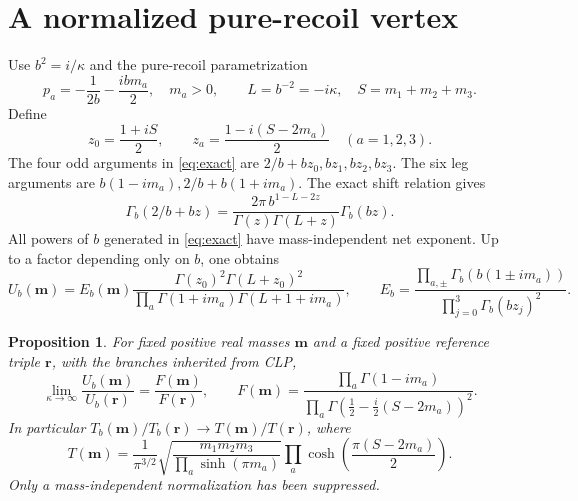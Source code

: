 \documentclass[11pt,a4paper]{article}
\newtheorem{proposition}{Proposition}
\begin{document}
\section{A normalized pure-recoil vertex}
Use \(b^2=i/\kappa\) and the pure-recoil parametrization
\[
 p_a=-\frac1{2b}-\frac{ibm_a}{2},\quad m_a>0,\qquad
 L=b^{-2}=-i\kappa,\quad S=m_1+m_2+m_3 .
\]
Define
\[
 z_0=\frac{1+iS}{2},\qquad
 z_a=\frac{1-i(S-2m_a)}2\quad(a=1,2,3).
\]
The four odd arguments in \eqref{eq:exact} are \(2/b+bz_0,bz_1,bz_2,bz_3\).
The six leg arguments are \(b(1-im_a),2/b+b(1+im_a)\).
The exact shift relation gives
\begin{equation}
 \Gamma_b(2/b+bz)=
 \frac{2\pi\,b^{1-L-2z}}{\Gamma(z)\Gamma(L+z)}\Gamma_b(bz).
 \label{eq:shift}
\end{equation}
All powers of \(b\) generated in \eqref{eq:exact} have mass-independent
net exponent. Up to a factor depending only on \(b\), one obtains
\begin{equation}
 U_b(\mathbf m)=
 E_b(\mathbf m)
 \frac{\Gamma(z_0)^2\Gamma(L+z_0)^2}
      {\prod_a\Gamma(1+im_a)\Gamma(L+1+im_a)},\qquad
 E_b=\frac{\prod_{a,\pm}\Gamma_b(b(1\pm im_a))}
                 {\prod_{j=0}^3\Gamma_b(bz_j)^2}.
 \label{eq:shifted}
\end{equation}

\begin{proposition}
For fixed positive real masses \(\mathbf m\) and a fixed positive
reference triple \(\mathbf r\), with the branches inherited from CLP,
\begin{equation}
 \lim_{\kappa\to\infty}\frac{U_b(\mathbf m)}{U_b(\mathbf r)}
 =\frac{F(\mathbf m)}{F(\mathbf r)},\qquad
 F(\mathbf m)=
 \frac{\prod_a\Gamma(1-im_a)}
      {\prod_a\Gamma(\frac12-\frac i2(S-2m_a))^2}.
 \label{eq:F}
\end{equation}
In particular \(T_b(\mathbf m)/T_b(\mathbf r)\to T(\mathbf m)/T(\mathbf r)\),
where
\begin{equation}
 T(\mathbf m)=
 \frac1{\pi^{3/2}}\sqrt{\frac{m_1m_2m_3}
                   {\prod_a\sinh(\pi m_a)}}
 \prod_a\cosh\!\left(\frac{\pi(S-2m_a)}2\right).
 \label{eq:T}
\end{equation}
Only a mass-independent normalization has been suppressed.
\end{proposition}
\end{document}
